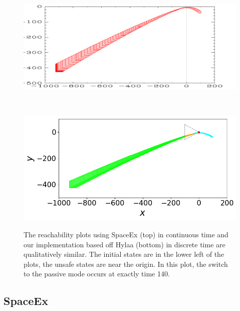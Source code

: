 \begin{figure}
\begin{minipage}[b]{\linewidth}
  \centering
    \includegraphics[width=0.9\columnwidth,trim=-7em 1em 7em 0, clip]{images/spaceex.png}
\end{minipage}
\\
\vspace{1em}
\begin{minipage}[b]{\linewidth}
  \centering
    \includegraphics[width=0.9\columnwidth,trim=0 1.5em 0 0, clip]{images/step_d_0_25.png}
\label{fig:hylaa_qualitative}
\end{minipage}
\caption{The reachability plots using SpaceEx (top) in continuous time and our implementation based off Hylaa (bottom) in discrete time are qualitatively similar.
The initial states are in the lower left of the plots, the unsafe states are near the origin. In this plot, the switch to the passive mode occurs at exactly time 140.}\label{fig:qualitative}
\end{figure}

\subsection{SpaceEx}

